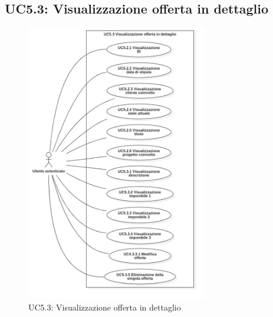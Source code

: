 \pagebreak

\subsection{UC5.3: Visualizzazione offerta in dettaglio}
\begin{figure}[!h]
\centering
\includegraphics[width=300px]{../images/UC/.jpeg/UC5.3.0-visualizzazioneDettaglioOfferta.jpg}
\caption{UC5.3: Visualizzazione offerta in dettaglio}
\label{fig:UC5.3}
\end{figure}

